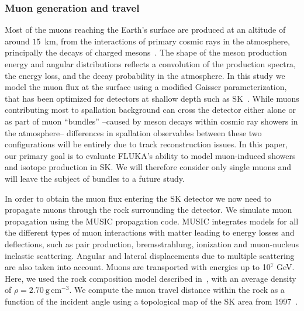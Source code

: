 \subsubsection{Muon generation and travel}
Most of the muons reaching the Earth's surface are produced at an altitude of around $15$~km, from the interactions of primary cosmic rays in the atmosphere, principally the decays of charged mesons~\cite{gaisser_book}. The shape of the meson production energy and angular distributions reflects a convolution of the production spectra, the energy loss, and the decay probability in the atmosphere. In this study we model the muon flux at the surface using a modified Gaisser parameterization, that has been optimized for detectors at shallow depth such as SK~\cite{muonsimulation}. While muons contributing most to spallation background can cross the detector either alone or as part of muon ``bundles'' --caused by meson decays within cosmic ray showers in the atmosphere-- differences in spallation observables between these two configurations will be entirely due to track reconstruction issues. In this paper, our primary goal is to evaluate FLUKA's ability to model muon-induced showers and isotope production in SK. We will therefore consider only single muons and will leave the subject of bundles to a future study.

In order to obtain the muon flux entering the SK detector we now need to propagate muons through the rock surrounding the detector. We simulate muon propagation using the MUSIC \cite{music,music2,music3} propagation code. MUSIC integrates models for all the different types of muon interactions with matter leading to energy losses and deflections, such as pair production, bremsstrahlung, ionization and muon-nucleus inelastic scattering. Angular and lateral displacements due to multiple scattering are also taken into account. Muons are transported with energies up to 10$^7$ GeV. Here, we used the rock composition model described in~\cite{muonsimulation}, with an average density of $\rho = 2.70~\mathrm{g\,cm^{-3}}$. We compute the muon travel distance within the rock as a function of the incident angle using a topological map of the SK area from 1997~\cite{muonsimuKAMLAND,geoinstitute}.

